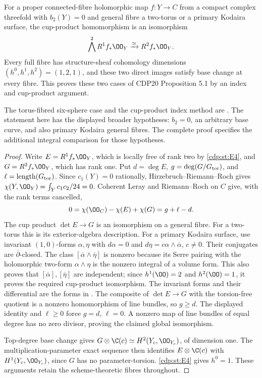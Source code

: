 
\begin{proposition}\label{cdp:st:D.1.12}
For a proper connected-fibre holomorphic map $f:Y\to C$ from a
compact complex threefold with $b_2(Y)=0$ and general fibre a
two-torus or a primary Kodaira surface, the cup-product homomorphism
is an isomorphism
\[
\bigwedge^2R^1f_*\OO_Y\xrightarrow{\simeq}R^2f_*\OO_Y.
\]
Every full fibre has structure-sheaf cohomology dimensions
$(h^0,h^1,h^2)=(1,2,1)$, and these two direct images satisfy
base change at every fibre. This proves these two cases of CDP20
Proposition 5.1 by an index and cup-product argument.
\end{proposition}

The torus-fibred six-sphere case and the cup-product index method are \citet[Theorem~2.3, pp.~5--6]{Viaclovsky2026Combs}. The statement here has the displayed broader hypotheses: $b_2=0$, an arbitrary base curve, and also primary Kodaira general fibres. The complete proof specifies the additional integral comparison for those hypotheses.

\begin{proof}
Write $E=R^1f_*\OO_Y$, which is locally free of rank two by \ref{cdp:st:E4},
and $G=R^2f_*\OO_Y$, which has rank one. Put
$d=\deg E$, $g=\deg(G/G_{\rm tor})$, and
$\ell=\operatorname{length}(G_{\rm tor})$.
Since $c_1(Y)=0$ rationally, Hirzebruch--Riemann--Roch gives
$\chi(Y,\OO_Y)=\int_Yc_1c_2/24=0$.
Coherent Leray and Riemann--Roch on $C$ give, with the rank terms
cancelled,
\[
0=\chi(\OO_C)-\chi(E)+\chi(G)=g+\ell-d.
\]
The cup product $\det E\to G$ is an isomorphism on a general
fibre. For a two-torus this is its exterior-algebra description.
For a primary Kodaira surface, use invariant $(1,0)$-forms
$\alpha,\eta$ with $d\alpha=0$ and
$d\eta=c\alpha\wedge\overline\alpha$, $c\ne0$.
Their conjugates are $\overline\partial$-closed. The class
$[\overline\alpha\wedge\overline\eta]$ is nonzero because its
Serre pairing with the holomorphic two-form $\alpha\wedge\eta$
is the nonzero integral of a volume form. This also proves that
$[\overline\alpha],[\overline\eta]$ are independent; since
$h^1(\OO)=2$ and $h^2(\OO)=1$, it proves the required cup-product
isomorphism. The invariant forms and their differential are
the forms in \cite[\S3, equations (9)--(12)]{Borcea1984}.
The composite of $\det E\to G$ with the torsion-free quotient is a
nonzero homomorphism of line bundles, so $g\geq d$. The displayed
identity and $\ell\geq0$ force $g=d$, $\ell=0$. A nonzero map
of line bundles of equal degree has no zero divisor, proving the
claimed global isomorphism.

Top-degree base change gives
$G\otimes\C(c)\simeq H^2(Y_c,\OO_{Y_c})$, of dimension one.
The multiplication-parameter exact sequence then identifies
$E\otimes\C(c)$ with $H^1(Y_c,\OO_{Y_c})$, since $G$ has no
parameter-torsion. \ref{cdp:st:E4} gives $h^0=1$. These arguments retain the
scheme-theoretic fibres throughout.
\end{proof}


